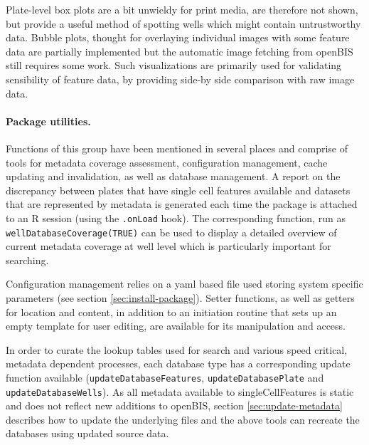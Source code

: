 Plate-level box plots are a bit unwieldy for print media, are therefore not shown, but provide a useful method of spotting wells which might contain untrustworthy data. Bubble plots, thought for overlaying individual images with some feature data are partially implemented but the automatic image fetching from openBIS still requires some work. Such visualizations are primarily used for validating sensibility of feature data, by providing side-by side comparison with raw image data.



\paragraph{Package utilities.}
Functions of this group have been mentioned in several places and comprise of tools for metadata coverage assessment, configuration management, cache updating and invalidation, as well as database management. A report on the discrepancy between plates that have single cell features available and datasets that are represented by metadata is generated each time the package is attached to an R session (using the \texttt{.onLoad} hook). The corresponding function, run as \texttt{wellDatabaseCoverage(TRUE)} can be used to display a detailed overview of current metadata coverage at well level which is particularly important for searching.

Configuration management relies on a yaml based file used storing system specific parameters (see section \ref{sec:install-package}). Setter functions, as well as getters for location and content, in addition to an initiation routine that sets up an empty template for user editing, are available for its manipulation and access.

In order to curate the lookup tables used for search and various speed critical, metadata dependent processes, each database type has a corresponding update function available (\texttt{updateDatabaseFeatures}, \texttt{updateDatabasePlate} and \texttt{updateDatabaseWells}). As all metadata available to singleCellFeatures is static and does not reflect new additions to openBIS, section \ref{sec:update-metadata} describes how to update the underlying files and the above tools can recreate the databases using updated source data.

